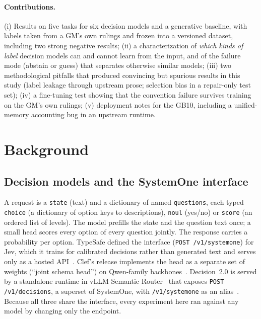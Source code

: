 \documentclass[11pt]{article}
\begin{document}
\paragraph{Contributions.} (i) Results on five tasks for six decision models and a generative
baseline, with labels taken from a GM's own rulings and frozen into a versioned dataset, including
two strong negative results; (ii) a characterization of \emph{which kinds of label} decision models
can and cannot learn from the input, and of the failure mode (abstain or guess) that separates
otherwise similar models; (iii) two methodological pitfalls that produced convincing but spurious
results in this study (label leakage through upstream prose; selection bias in a repair-only test
set); (iv) a fine-tuning test showing that the convention failure survives training on the GM's
own rulings; (v) deployment notes for the GB10, including a unified-memory accounting bug in an
upstream runtime.

\section{Background}

\subsection{Decision models and the SystemOne interface}
A request is a \texttt{state} (text) and a dictionary of named \texttt{questions}, each typed
\texttt{choice} (a dictionary of option keys to descriptions), \texttt{noul} (yes/no) or
\texttt{score} (an ordered list of levels). The model prefills the state and the question text once;
a small head scores every option of every question jointly. The response carries a probability per
option. TypeSafe defined the interface (\texttt{POST /v1/systemone}) for Jev, which it trains for
calibrated decisions rather than generated text and serves only as a hosted
API~\cite{typesafe}. Clef's release implements the head as a separate set of weights (``joint
schema head'') on Qwen-family backbones~\cite{clef}. Decision~2.0 is served by a standalone runtime
in vLLM Semantic Router~\cite{vllmsr,vllmsrvision} that exposes \texttt{POST /v1/decisions}, a
superset of SystemOne, with \texttt{/v1/systemone} as an alias~\cite{vllmsrruntime}. Because all
three share the interface, every experiment here ran against any model by changing only the
endpoint.
\end{document}
